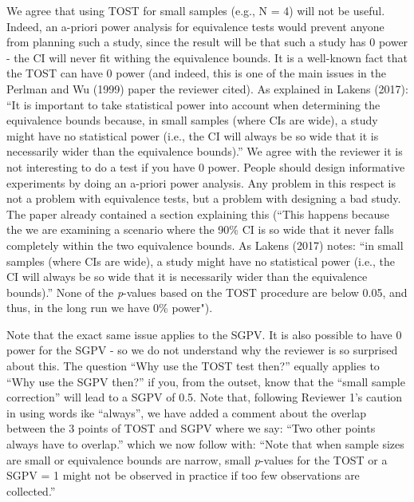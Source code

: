 \documentclass[man]{apa6}
\begin{document}
\begin{enumerate}
  We agree that using TOST for small samples (e.g., N = 4) will not be useful. Indeed, an a-priori power analysis for equivalence tests would prevent anyone from planning such a study, since the result will be that such a study has 0 power - the CI will never fit withing the equivalence bounds. It is a well-known fact that the TOST can have 0 power (and indeed, this is one of the main issues in the Perlman and Wu (1999) paper the reviewer cited). As explained in Lakens (2017): \enquote{It is important to take statistical power into account when determining the equivalence bounds because, in small samples (where CIs are wide), a study might have no statistical power (i.e., the CI will always be so wide that it is necessarily wider than the equivalence bounds).} We agree with the reviewer it is not interesting to do a test if you have 0 power. People should design informative experiments by doing an a-priori power analysis. Any problem in this respect is not a problem with equivalence tests, but a problem with designing a bad study. The paper already contained a section explaining this (\enquote{This happens because the we are examining a scenario where the 90\% CI is so wide that it never falls completely within the two equivalence bounds. As Lakens (2017) notes: ``in small samples (where CIs are wide), a study might have no statistical power (i.e., the CI will always be so wide that it is necessarily wider than the equivalence bounds).} None of the \emph{p}-values based on the TOST procedure are below 0.05, and thus, in the long run we have 0\% power").
\end{enumerate}

Note that the exact same issue applies to the SGPV. It is also possible to have 0 power for the SGPV - so we do not understand why the reviewer is so surprised about this. The question \enquote{Why use the TOST test then?} equally applies to \enquote{Why use the SGPV then?} if you, from the outset, know that the \enquote{small sample correction} will lead to a SGPV of 0.5. Note that, following Reviewer 1's caution in using words ike \enquote{always}, we have added a comment about the overlap between the 3 points of TOST and SGPV where we say: \enquote{Two other points always have to overlap.} which we now follow with: \enquote{Note that when sample sizes are small or equivalence bounds are narrow, small \emph{p}-values for the TOST or a SGPV = 1 might not be observed in practice if too few observations are collected.}
\end{document}
